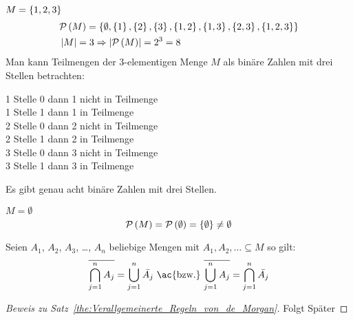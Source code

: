 \begin{example}
$M = \left\{1, 2, 3\right\}$
\begin{align*}
&\mathcal{P}\left(M\right) = \left\{\emptyset, \left\{1\right\}, \left\{2\right\}, \left\{3\right\}, \left\{1,2\right\}, \left\{1,3\right\}, \left\{2,3\right\}, \left\{1,2,3\right\}\right\}\\
&\left|M\right| = 3 \Rightarrow \left|\mathcal{P}\left(M\right)\right| = 2^3 = 8
\end{align*}
Man kann Teilmengen der 3-elementigen Menge $M$ als binäre Zahlen mit drei Stellen betrachten:

1 Stelle 0 dann 1 nicht in Teilmenge\\
1 Stelle 1 dann 1 in Teilmenge\\
2 Stelle 0 dann 2 nicht in Teilmenge\\
2 Stelle 1 dann 2 in Teilmenge\\
3 Stelle 0 dann 3 nicht in Teilmenge\\
3 Stelle 1 dann 3 in Teilmenge

Es gibt genau acht binäre Zahlen mit drei Stellen.
\end{example}

\begin{note}
$M = \emptyset$ \[\mathcal{P}\left(M\right) = \mathcal{P}\left(\emptyset\right) = \left\{\emptyset\right\} \neq \emptyset\]
\end{note}

\begin{theorem}
Seien $A_1$, $A_2$, $A_3$, \dots, $A_n$ beliebige Mengen mit $A_1, A_2, \dots \subseteq M$ so gilt:
\[\ol{\bigcap_{j = 1}^{n} A_j} = \bigcup_{j = 1}^{n} \bar{A_j} \tx{ \ac{bzw.} } \ol{\bigcup_{j = 1}^{n} A_j} = \bigcap_{j = 1}^{n} \bar{A_j}\]
\label{the:Verallgemeinerte_Regeln_von_de_Morgan}
\end{theorem}

\begin{proof}[Beweis zu Satz~\vref{the:Verallgemeinerte_Regeln_von_de_Morgan}]
Folgt Später
\end{proof}
